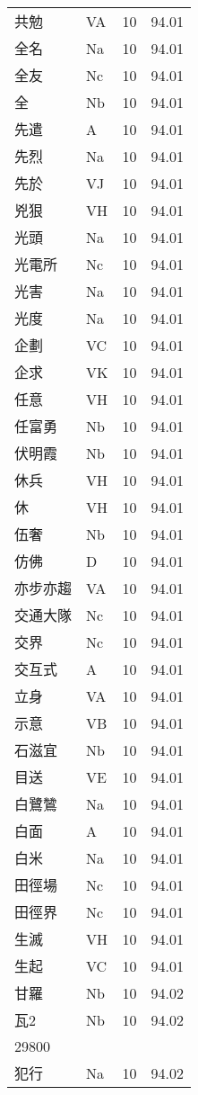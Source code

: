 \documentclass[twocolumn]{book}
\begin{document}
\begin{supertabular}{llrr}
共勉 & VA & 10 &  94.01\\
全名 & Na & 10 &  94.01\\
全友 & Nc & 10 &  94.01\\
全 & Nb & 10 &  94.01\\
先遣 & A & 10 &  94.01\\
先烈 & Na & 10 &  94.01\\
先於 & VJ & 10 &  94.01\\
兇狠 & VH & 10 &  94.01\\
光頭 & Na & 10 &  94.01\\
光電所 & Nc & 10 &  94.01\\
光害 & Na & 10 &  94.01\\
光度 & Na & 10 &  94.01\\
企劃 & VC & 10 &  94.01\\
企求 & VK & 10 &  94.01\\
任意 & VH & 10 &  94.01\\
任富勇 & Nb & 10 &  94.01\\
伏明霞 & Nb & 10 &  94.01\\
休兵 & VH & 10 &  94.01\\
休 & VH & 10 &  94.01\\
伍奢 & Nb & 10 &  94.01\\
仿佛 & D & 10 &  94.01\\
亦步亦趨 & VA & 10 &  94.01\\
交通大隊 & Nc & 10 &  94.01\\
交界 & Nc & 10 &  94.01\\
交互式 & A & 10 &  94.01\\
立身 & VA & 10 &  94.01\\
示意 & VB & 10 &  94.01\\
石滋宜 & Nb & 10 &  94.01\\
目送 & VE & 10 &  94.01\\
白鷺鷥 & Na & 10 &  94.01\\
白面 & A & 10 &  94.01\\
白米 & Na & 10 &  94.01\\
田徑場 & Nc & 10 &  94.01\\
田徑界 & Nc & 10 &  94.01\\
生滅 & VH & 10 &  94.01\\
生起 & VC & 10 &  94.01\\
甘羅 & Nb & 10 &  94.02\\
瓦2 & Nb & 10 &  94.02\\
29800\\
犯行 & Na & 10 &  94.02\\

\end{supertabular}
\end{document}
